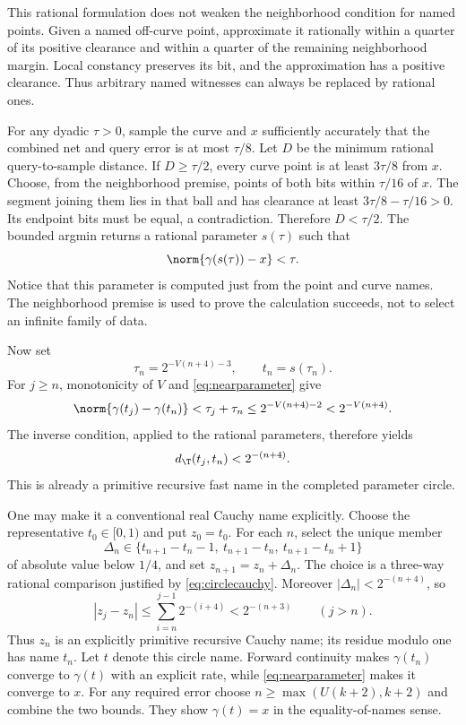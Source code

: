 This rational formulation does not weaken the neighborhood
condition for named points. Given a named off-curve point,
approximate it rationally within a quarter of its positive
clearance and within a quarter of the remaining neighborhood
margin. Local constancy preserves its bit, and the approximation
has a positive clearance. Thus arbitrary named witnesses can
always be replaced by rational ones.

For any dyadic $\tau>0$, sample the curve and $x$ sufficiently
accurately that the combined net and query error is at most
$\tau/8$. Let $D$ be the minimum rational query-to-sample
distance. If $D\ge\tau/2$, every curve point is at least
$3\tau/8$ from $x$. Choose, from the neighborhood premise,
points of both bits within $\tau/16$ of $x$. The segment
joining them lies in that ball and has clearance at least
$3\tau/8-\tau/16>0$. Its endpoint bits must be equal,
a contradiction. Therefore $D<\tau/2$.
The bounded argmin returns a rational parameter $s(\tau)$ such that
\begin{equation}
                     \norm{\gamma(s(\tau))-x}<\tau.
 \label{eq:nearparameter}
\end{equation}
Notice that this parameter is computed just from the point and
curve names. The neighborhood premise is used to prove the
calculation succeeds, not to select an infinite family of data.

Now set
\[
 \tau_n=2^{-V(n+4)-3},\qquad t_n=s(\tau_n).
\]
For $j\ge n$, monotonicity of $V$ and \eqref{eq:nearparameter}
give
\[
 \norm{\gamma(t_j)-\gamma(t_n)}
    <\tau_j+\tau_n\le 2^{-V(n+4)-2}<2^{-V(n+4)}.
\]
The inverse condition, applied to the rational parameters,
therefore yields
\begin{equation}
                         d_\T(t_j,t_n)<2^{-(n+4)}.
 \label{eq:circlecauchy}
\end{equation}
This is already a primitive recursive fast name in the completed
parameter circle.

One may make it a conventional real Cauchy name explicitly.
Choose the representative $t_0\in[0,1)$ and put $z_0=t_0$.
For each $n$, select the unique member
\[
 \Delta_n\in\{t_{n+1}-t_n-1,\ t_{n+1}-t_n,\ t_{n+1}-t_n+1\}
\]
of absolute value below $1/4$, and set $z_{n+1}=z_n+\Delta_n$.
The choice is a three-way rational comparison justified by
\eqref{eq:circlecauchy}. Moreover
$|\Delta_n|<2^{-(n+4)}$, so
\[
              |z_j-z_n|\le\sum_{i=n}^{j-1}2^{-(i+4)}
                         <2^{-(n+3)}\qquad(j>n).
\]
Thus $z_n$ is an explicitly primitive recursive Cauchy name;
its residue modulo one has name $t_n$. Let $t$ denote this
circle name. Forward continuity makes $\gamma(t_n)$ converge
to $\gamma(t)$ with an explicit rate, while
\eqref{eq:nearparameter} makes it converge to $x$.
For any required error choose
$n\ge\max(U(k+2),k+2)$ and combine the two bounds.
They show $\gamma(t)=x$ in the equality-of-names sense.

